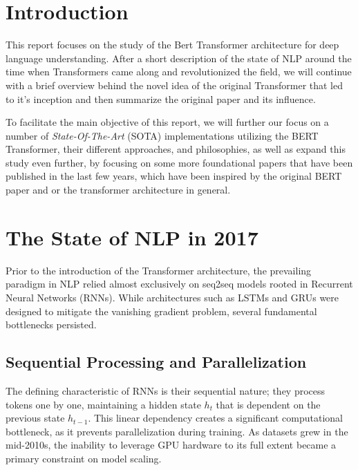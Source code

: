 \documentclass[a4paper,12pt]{article}
\begin{document}

\newpage

\tableofcontents


\clearpage
\section{Introduction}
This report focuses on the study of the Bert Transformer architecture for deep language understanding. After a short description of the state of NLP around the time when Transformers came along and revolutionized the field, we will continue with a brief overview behind the novel idea of the original Transformer that led to it's inception \citep{vaswani2017attention} and then summarize the original paper \citep{devlin2019bert} and its influence. 

To facilitate the main objective of this report, we will further our focus on a number of \textit{State-Of-The-Art} (SOTA) implementations utilizing the BERT Transformer, their different approaches, and philosophies, as well as expand this study even further, by focusing on some more foundational papers that have been published in the last few years, which have been inspired by the original BERT paper and or the transformer architecture in general.

\section{The State of NLP in 2017}
Prior to the introduction of the Transformer architecture, the prevailing paradigm in NLP relied almost exclusively on seq2seq models rooted in Recurrent Neural Networks (RNNs). While architectures such as LSTMs \citep{hochreiter1997long} and GRUs were designed to mitigate the vanishing gradient problem, several fundamental bottlenecks persisted.

\subsection{Sequential Processing and Parallelization}
The defining characteristic of RNNs is their sequential nature; they process tokens one by one, maintaining a hidden state $h_t$ that is dependent on the previous state $h_{t-1}$. This linear dependency creates a significant computational bottleneck, as it prevents parallelization during training. As datasets grew in the mid-2010s, the inability to leverage GPU hardware to its full extent became a primary constraint on model scaling.
\end{document}

